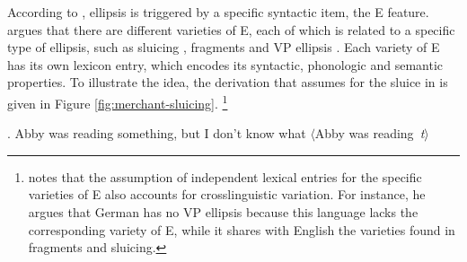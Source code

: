 According to \citet{merchant2004}, ellipsis is triggered by a specific syntactic item, the E feature. \citeauthor{merchant2004} argues that there are different varieties of E, each of which is related to a specific type of ellipsis, such as sluicing \citep{merchant2001}, fragments \citep{merchant2004} and VP ellipsis \citep{merchant2013}. Each variety of E has its own lexicon entry, which encodes its syntactic, phonologic and semantic properties. To illustrate the idea, the derivation that \citeauthor{merchant2004} assumes for the sluice in \Next is given in Figure \ref{fig:merchant-sluicing}.%
%
\footnote{\citet[671]{merchant2004} notes that the assumption of independent lexical entries for the specific varieties of E also accounts for crosslinguistic variation. For instance, he argues that German has no VP ellipsis because this language lacks the corresponding variety of E, while it shares with English the varieties found in fragments and sluicing.}\afterfn%
%

\ex. Abby was reading something, but I don’t know what $\langle$Abby was reading~\textit{t}$\rangle$ \mbox{}\hfill \citep[670]{merchant2004}\label{ex:merchant-sluicing}

